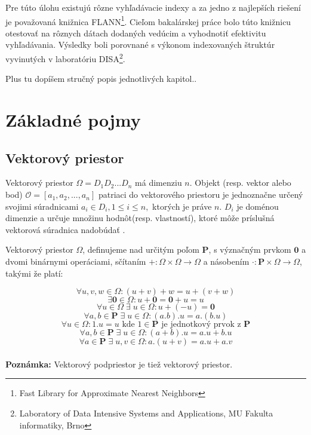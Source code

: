 \documentclass[12pt,a4paper,oneside]{fithesis2}
\begin{document}
Pre túto úlohu existujú rôzne vyhľadávacie indexy a za jedno z najlepších riešení je považovaná knižnica FLANN\footnote{Fast Library for Approximate Nearest Neighbors}. Cieľom bakalárskej práce bolo túto knižnicu otestovať na rôznych dátach dodaných vedúcim a vyhodnotiť efektivitu vyhľadávania. Výsledky boli porovnané s výkonom indexovaných štruktúr vyvinutých v laboratóriu DISA\footnote{Laboratory of Data Intensive Systems and Applications, MU Fakulta informatiky, Brno}.

Plus tu dopíšem stručný popis jednotlivých kapitol..

    \chapter{Základné pojmy}
    
    	\section{Vektorový priestor}
    Vektorový priestor $ \Omega = D_1D_2. . .D_n $ má dimenziu $n$. Objekt (resp. vektor alebo bod)  $\mathcal{O} = [a_1, a_2, . . . , a_n] $ patriaci do vektorového priestoru je jednoznačne určený svojimi súradnicami $ a_i \in D_i, 1 \le i \le n, $ ktorých je práve $n$. $D_i$ je doménou dimenzie a určuje množinu hodnôt(resp. vlastností), ktoré môže príslušná vektorová súradnica nadobúdať \cite{stromy}.
    	
    Vektorový priestor $\Omega$, definujeme nad určitým poľom $\mathbf{P} $, s význačným prvkom $\mathbf{0}$ a dvomi binárnymi operáciami, sčítaním $+ : \Omega \times \Omega \rightarrow \Omega $  a násobením $\cdot : \mathbf{P}  \times \Omega \rightarrow \Omega$, takými že platí: 
     
\begin{equation*}
\forall u,v,w \in \Omega : (u + v)+w = u+(v+w) 
\end{equation*}
\begin{equation*}
\exists\mathbf{0} \in \Omega : u+\mathbf{0} = \mathbf{0}+u = u
\end{equation*}
\begin{equation*}
\forall u \in \Omega \; \exists \; u \in \Omega : u+(-u)  = \mathbf{0}
\end{equation*}
\begin{equation*}
\forall a,b \in \mathbf{P} \; \exists \; u \in \Omega : (a.b).u = a.(b.u) 
\end{equation*}
\begin{equation*}
\forall u \in \Omega : 1.u=u  \textrm{ kde } 1 \in \mathbf{P}  \textrm{ je jednotkový prvok z } \mathbf{P} 
\end{equation*}
\begin{equation*}
\forall a,b \in \mathbf{P} \; \exists \;u \in \Omega : (a+b).u = a.u + b.u 
\end{equation*}
\begin{equation*}
\forall a \in \mathbf{P} \; \exists \;u,v \in \Omega : a.(u+v) = a.u + a.v 
\end{equation*} \\
\textbf{Poznámka:} Vektorový podpriestor je tiež vektorový priestor.
\end{document}
